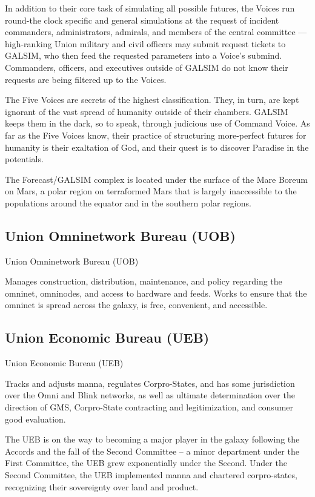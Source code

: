 In addition to their core task of simulating all possible futures, the Voices run round-the clock
specific and general simulations at the request of incident commanders, administrators,
admirals, and members of the central committee — high-ranking Union military and civil officers
may submit request tickets to GALSIM, who then feed the requested parameters into a Voice’s
submind. Commanders, officers, and executives outside of GALSIM do not know their requests
are being filtered up to the Voices.


The Five Voices are secrets of the highest classification. They, in turn, are kept ignorant of the
vast spread of humanity outside of their chambers. GALSIM keeps them in the dark, so to speak,
through judicious use of Command Voice. As far as the Five Voices know, their practice of
structuring more-perfect futures for humanity is their exaltation of God, and their quest is to
discover Paradise in the potentials.


The Forecast/GALSIM complex is located under the surface of the Mare Boreum on Mars, a
polar region on terraformed Mars that is largely inaccessible to the populations around the
equator and in the southern polar regions.

\subsection{Union Omninetwork Bureau (UOB)}
Union Omninetwork Bureau (UOB)

Manages construction, distribution, maintenance, and policy regarding the omninet, omninodes,
and access to hardware and feeds. Works to ensure that the omninet is spread across the
galaxy, is free, convenient, and accessible.


\subsection{Union Economic Bureau (UEB) }

Union Economic Bureau (UEB)

Tracks and adjusts manna, regulates Corpro-States, and has some jurisdiction over the Omni
and Blink networks, as well as ultimate determination over the direction of GMS, Corpro-State
contracting and legitimization, and consumer good evaluation.


The UEB is on the way to becoming a major player in the galaxy following the Accords and the
fall of the Second Committee -- a minor department under the First Committee, the UEB grew
exponentially under the Second. Under the Second Committee, the UEB implemented manna
and chartered corpro-states, recognizing their sovereignty over land and product.


